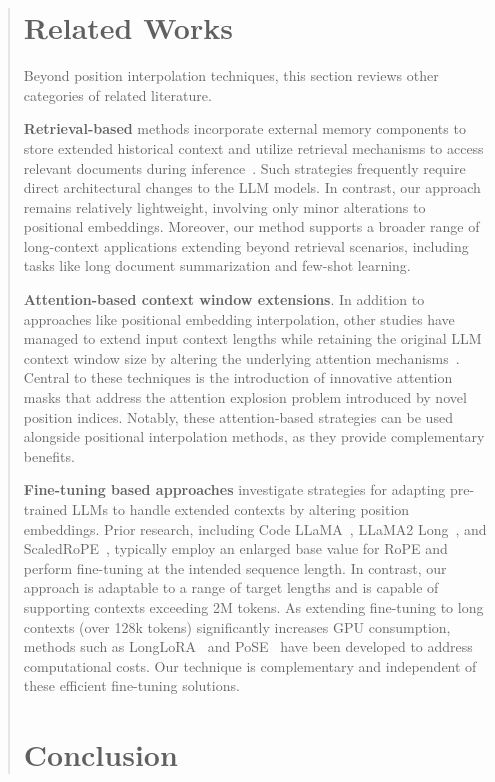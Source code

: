 \begin{abstract}
\section{Related Works}

Beyond position interpolation techniques, this section reviews other categories of related literature.

\textbf{Retrieval-based} methods incorporate external memory components to store extended historical context and utilize retrieval mechanisms to access relevant documents during inference~\cite{longllama,wang2023augmenting,borgeaud2022improving}. Such strategies frequently require direct architectural changes to the LLM models. In contrast, our approach remains relatively lightweight, involving only minor alterations to positional embeddings. Moreover, our method supports a broader range of long-context applications extending beyond retrieval scenarios, including tasks like long document summarization and few-shot learning.

\textbf{Attention-based context window extensions}. In addition to approaches like positional embedding interpolation, other studies have managed to extend input context lengths while retaining the original LLM context window size by altering the underlying attention mechanisms~\cite{han2023lminfinite, streamingllm,parallelwindow}. Central to these techniques is the introduction of innovative attention masks that address the attention explosion problem introduced by novel position indices. Notably, these attention-based strategies can be used alongside positional interpolation methods, as they provide complementary benefits.

\textbf{Fine-tuning based approaches} investigate strategies for adapting pre-trained LLMs to handle extended contexts by altering position embeddings. Prior research, including Code LLaMA~\cite{codellama}, LLaMA2 Long~\cite{xiong2023effective}, and ScaledRoPE~\cite{liu2023scaling}, typically employ an enlarged base value for RoPE and perform fine-tuning at the intended sequence length. In contrast, our approach is adaptable to a range of target lengths and is capable of supporting contexts exceeding 2M tokens. As extending fine-tuning to long contexts (over 128k tokens) significantly increases GPU consumption, methods such as LongLoRA~\cite{longlora} and PoSE~\cite{zhu2023pose} have been developed to address computational costs. Our technique is complementary and independent of these efficient fine-tuning solutions.

\section{Conclusion}


\end{abstract}
